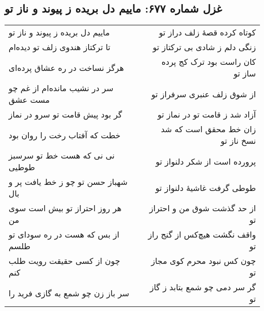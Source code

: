 \begin{center}
\section*{غزل شماره ۶۷۷: ماییم دل بریده ز پیوند و ناز تو}
\label{sec:677}
\begin{longtable}{l p{0.5cm} r}
ماییم دل بریده ز پیوند و ناز تو
&&
کوتاه کرده قصهٔ زلف دراز تو
\\
تا ترکتاز هندوی زلف تو دیده‌ام
&&
زنگی دلم ز شادی بی ترکتاز تو
\\
هرگز نساخت در ره عشاق پرده‌ای
&&
کان راست بود ترک کج پرده ساز تو
\\
سر در نشیب مانده‌ام از غم چو مست عشق
&&
از شوق زلف عنبری سرفراز تو
\\
گر بود پیش قامت تو سرو در نماز
&&
آزاد شد ز قامت تو در نماز تو
\\
خطت که آفتاب رخت را روان بود
&&
زان خط محقق است که شد نسخ ناز تو
\\
نی نی که هست خط تو سرسبز طوطیی
&&
پرورده است از شکر دلنواز تو
\\
شهباز حسن تو چو ز خط یافت پر و بال
&&
طوطی گرفت غاشیهٔ دلنواز تو
\\
هر روز احتراز تو بیش است سوی من
&&
از حد گذشت شوق من و احتراز تو
\\
از بس که هست در ره سودای تو طلسم
&&
واقف نگشت هیچ‌کس از گنج راز تو
\\
چون از کسی حقیقت رویت طلب کنم
&&
چون کس نبود محرم کوی مجاز تو
\\
سر باز زن چو شمع به گازی فرید را
&&
گر سر دمی چو شمع بتابد ز گاز تو
\\
\end{longtable}
\end{center}

